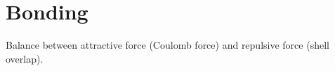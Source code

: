 \section{Bonding}
Balance between attractive force (Coulomb force) and repulsive force (shell overlap).




